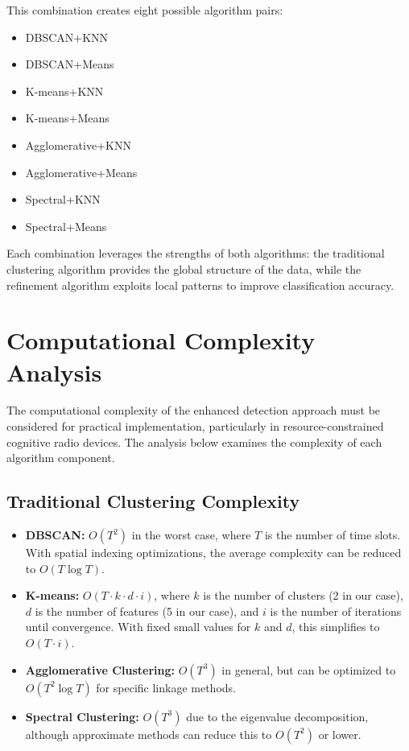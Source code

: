 This combination creates eight possible algorithm pairs:
\begin{itemize}
    \item DBSCAN+KNN
    \item DBSCAN+Means
    \item K-means+KNN
    \item K-means+Means
    \item Agglomerative+KNN
    \item Agglomerative+Means
    \item Spectral+KNN
    \item Spectral+Means
\end{itemize}

Each combination leverages the strengths of both algorithms: the traditional clustering algorithm provides the global structure of the data, while the refinement algorithm exploits local patterns to improve classification accuracy.

\section{Computational Complexity Analysis}

The computational complexity of the enhanced detection approach must be considered for practical implementation, particularly in resource-constrained cognitive radio devices. The analysis below examines the complexity of each algorithm component.

\subsection{Traditional Clustering Complexity}

\begin{itemize}
    \item \textbf{DBSCAN:} $O(T^2)$ in the worst case, where $T$ is the number of time slots. With spatial indexing optimizations, the average complexity can be reduced to $O(T \log T)$.
    
    \item \textbf{K-means:} $O(T \cdot k \cdot d \cdot i)$, where $k$ is the number of clusters (2 in our case), $d$ is the number of features (5 in our case), and $i$ is the number of iterations until convergence. With fixed small values for $k$ and $d$, this simplifies to $O(T \cdot i)$.
    
    \item \textbf{Agglomerative Clustering:} $O(T^3)$ in general, but can be optimized to $O(T^2 \log T)$ for specific linkage methods.
    
    \item \textbf{Spectral Clustering:} $O(T^3)$ due to the eigenvalue decomposition, although approximate methods can reduce this to $O(T^2)$ or lower.
\end{itemize}

